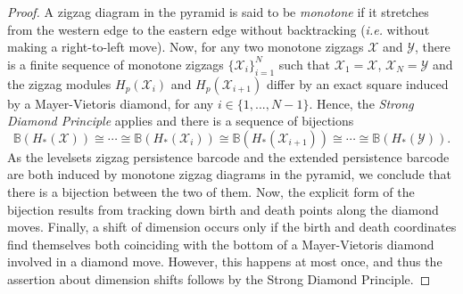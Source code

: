 \documentclass[11pt]{article}
\theoremstyle{remark}
\newcommand{\B}{\mathbb{B}}
\begin{document}
\begin{proof}
A zigzag diagram in the pyramid is said to be \emph{monotone} if it stretches from the western edge to the eastern edge without backtracking (\textit{i.e.} without making a right-to-left move). Now, for any two monotone zigzags $\mathcal{X}$ and $\mathcal{Y}$, there is a finite sequence of monotone zigzags $\{\mathcal{X}_i\}_{i=1}^{N}$ such that $\mathcal{X}_1=\mathcal{X}$, $\mathcal{X}_N=\mathcal{Y}$ and the zigzag modules $H_p(\mathcal{X}_i)$ and $H_p(\mathcal{X}_{i+1})$ differ by an exact square induced by a Mayer-Vietoris diamond, for any $i\in\{1,...,N-1\}$. Hence, the \emph{Strong Diamond Principle} applies and there is a sequence of bijections
$$\B(H_*(\mathcal{X}))\cong\cdots\cong\B(H_*(\mathcal{X}_i))\cong \B(H_*(\mathcal{X}_{i+1}))\cong\cdots\cong\B(H_*(\mathcal{Y})).$$ As the levelsets zigzag persistence barcode and the extended persistence barcode are both induced by monotone zigzag diagrams in the pyramid, we conclude that there is a bijection between the two of them. Now, the explicit form of the bijection results from tracking down birth and death points along the diamond moves. Finally, a shift of dimension occurs only if the birth and death coordinates find themselves both coinciding with the bottom of a Mayer-Vietoris diamond involved in a diamond move. However, this happens at most once, and thus the assertion about dimension shifts follows by the Strong Diamond Principle.
\end{proof}
\end{document}
